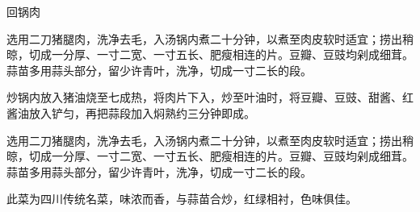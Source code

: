 \begin{recipe}{回锅肉}

\begin{ingredients}
\end{ingredients}

\begin{method}
\item 选用二刀猪腿肉，洗净去毛，入汤锅内煮二十分钟，以煮至肉皮软时适宜；捞出稍晾，切成一分厚、一寸二宽、一寸五长、肥瘦相连的片。豆瓣、豆豉均剁成细茸。蒜苗多用蒜头部分，留少许青叶，洗净，切成一寸二长的段。
\item 炒锅内放入猪油烧至七成热，将肉片下入，炒至叶油时，将豆瓣、豆豉、甜酱、红酱油放入铲匀，再把蒜段加入焖熟约三分钟即成。
\item 选用二刀猪腿肉，洗净去毛，入汤锅内煮二十分钟，以煮至肉皮软时适宜；捞出稍晾，切成一分厚、一寸二宽、一寸五长、肥瘦相连的片。豆瓣、豆豉均剁成细茸。蒜苗多用蒜头部分，留少许青叶，洗净，切成一寸二长的段。
\end{method}

\begin{note}
此菜为四川传统名菜，味浓而香，与蒜苗合炒，红绿相衬，色味俱佳。
\end{note}

\end{recipe}
